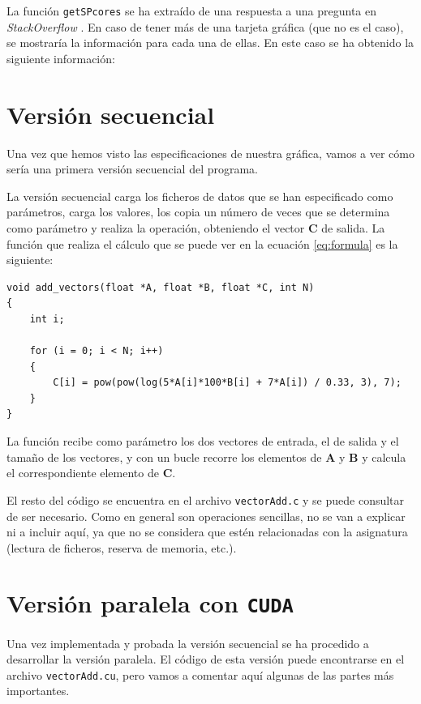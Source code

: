 \documentclass[11pt,a4paper]{article}
\renewcommand{\vec}[1]{\mathbf{#1}}
\begin{document}
La función \texttt{getSPcores} se ha extraído de una respuesta a una pregunta en
\textit{StackOverflow} \cite{cuda-sp}. En caso de tener más de una tarjeta gráfica
(que no es el caso), se mostraría la información para cada una de ellas. En este
caso se ha obtenido la siguiente información:


\section{Versión secuencial}

Una vez que hemos visto las especificaciones de nuestra gráfica, vamos a ver cómo sería
una primera versión secuencial del programa.

La versión secuencial carga los ficheros de datos que se han especificado como parámetros,
carga los valores, los copia un número de veces que se determina como parámetro y realiza
la operación, obteniendo el vector $\vec{C}$ de salida. La función que realiza el cálculo
que se puede ver en la ecuación \eqref{eq:formula} es la siguiente:

\begin{lstlisting}
void add_vectors(float *A, float *B, float *C, int N)
{
    int i;

    for (i = 0; i < N; i++)
    {
        C[i] = pow(pow(log(5*A[i]*100*B[i] + 7*A[i]) / 0.33, 3), 7);
    }
}
\end{lstlisting}

La función recibe como parámetro los dos vectores de entrada, el de salida y el
tamaño de los vectores, y con un bucle recorre los elementos de $\vec{A}$ y $\vec{B}$
y calcula el correspondiente elemento de $\vec{C}$.

El resto del código se encuentra en el archivo \texttt{vectorAdd.c} y se puede consultar
de ser necesario. Como en general son operaciones sencillas, no se van a explicar ni a incluir
aquí, ya que no se considera que estén relacionadas con la asignatura (lectura de ficheros,
reserva de memoria, etc.).

\section{Versión paralela con \texttt{CUDA}}

Una vez implementada y probada la versión secuencial se ha procedido a desarrollar
la versión paralela. El código de esta versión puede encontrarse en el archivo
\texttt{vectorAdd.cu}, pero vamos a comentar aquí algunas de las partes
más importantes.
\end{document}

